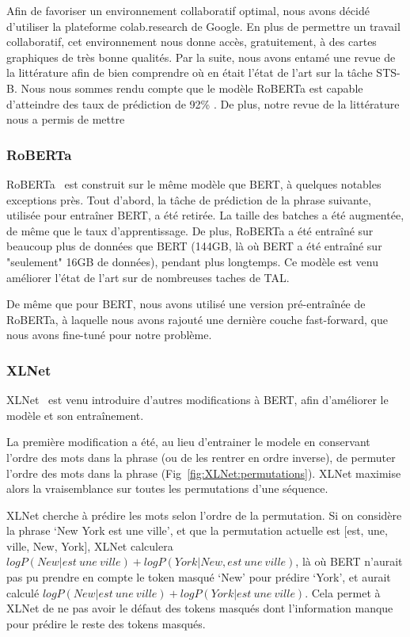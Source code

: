 \documentclass[11pt,a4paper, french]{article}
\begin{document}
Afin de favoriser un environnement collaboratif optimal, nous avons décidé d’utiliser la plateforme colab.research de Google. En plus de permettre un travail collaboratif, cet environnement nous donne accès, gratuitement, à des cartes graphiques de très bonne qualités. Par la suite, nous avons entamé une revue de la littérature afin de bien comprendre où en était l’état de l’art sur la tâche STS-B. Nous nous sommes rendu compte que le modèle RoBERTa est capable d’atteindre des taux de prédiction de 92\% \cite{RoBERTa}. De plus, notre revue de la littérature nous a permis de mettre 


\subsubsection{RoBERTa}

RoBERTa~\cite{RoBERTa} est construit sur le même modèle que BERT, à quelques notables exceptions près. Tout d'abord, la tâche de prédiction de la phrase suivante, utilisée pour entraîner BERT, a été retirée. La taille des batches a été augmentée, de même que le taux d'apprentissage. De plus, RoBERTa a été entraîné sur beaucoup plus de données que BERT (144GB, là où BERT a été entraîné sur "seulement" 16GB de données), pendant plus longtemps. Ce modèle est venu améliorer l'état de l'art sur de nombreuses taches de TAL.

De même que pour BERT, nous avons utilisé une version pré-entraînée de RoBERTa, à laquelle nous avons rajouté une dernière couche fast-forward, que nous avons fine-tuné pour notre problème.


\subsubsection{XLNet}

XLNet~\cite{yang2019xlnet} est venu introduire d'autres modifications à BERT, afin d'améliorer le modèle et son entraînement.

La première modification a été, au lieu d'entrainer le modele en conservant l'ordre des mots dans la phrase (ou de les rentrer en ordre inverse), de permuter l'ordre des mots dans la phrase (Fig~\ref{fig:XLNet:permutations}). XLNet maximise alors la vraisemblance sur toutes les permutations d'une séquence.

XLNet cherche à prédire les mots selon l'ordre de la permutation. Si on considère la phrase `New York est une ville', et que la permutation actuelle est [est, une, ville, New, York], XLNet calculera $log P(New | est~une~ville) + log P(York | New, est~une~ville)$, là où BERT n'aurait pas pu prendre en compte le token masqué `New' pour prédire `York', et aurait calculé  $log P(New | est~une~ville) + log P(York | est~une~ville)$. Cela permet à XLNet de ne pas avoir le défaut des tokens masqués dont l'information manque pour prédire le reste des tokens masqués.
\end{document}
